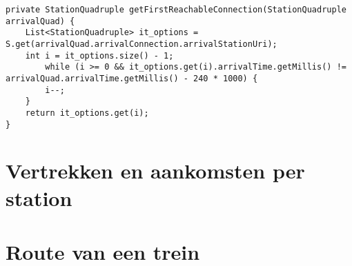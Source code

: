 \begin{code}
	\begin{verbatim}
private StationQuadruple getFirstReachableConnection(StationQuadruple arrivalQuad) {
	List<StationQuadruple> it_options = S.get(arrivalQuad.arrivalConnection.arrivalStationUri);
	int i = it_options.size() - 1;
		while (i >= 0 && it_options.get(i).arrivalTime.getMillis() != arrivalQuad.arrivalTime.getMillis() - 240 * 1000) {
		i--;
	}
	return it_options.get(i);
}
		\end{verbatim}
\end{code}

\section{Vertrekken en aankomsten per station}

\section{Route van een trein}